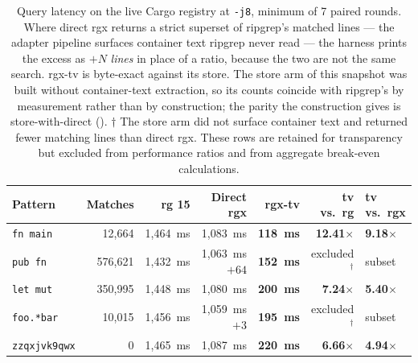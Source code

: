 \documentclass[11pt,letterpaper]{article}
\begin{document}
\begin{table}[htbp]
\centering
\footnotesize
\caption{Query latency on the live Cargo registry at \texttt{-j8},
minimum of 7 paired rounds. Where direct rgx returns a strict superset of
ripgrep's matched lines --- the adapter pipeline surfaces container text
ripgrep never read --- the harness prints the excess as $+N$ \emph{lines} in
place of a ratio, because the two are not the same search. rgx-tv is
byte-exact against its store. The store arm of this snapshot was built without
container-text extraction, so its counts coincide with ripgrep's by
measurement rather than by construction; the parity the construction gives is
store-with-direct (). $\dagger$ The store arm did not surface
container text and returned fewer matching lines than direct rgx. These rows are
retained for transparency but excluded from performance ratios and from
aggregate break-even calculations.}
\label{tab:cargo}
\begin{tabular}{@{}lrrrrrl@{}}
\toprule
\textbf{Pattern} & \textbf{Matches} & \textbf{rg 15} & \textbf{Direct rgx}
  & \textbf{rgx-tv} & \textbf{tv vs.\ rg} & \textbf{tv vs.\ rgx} \\
\midrule
\texttt{fn main}     &  12{,}664 & 1{,}464~ms & 1{,}083~ms & \textbf{118~ms} & \textbf{12.41$\times$} & \textbf{9.18$\times$} \\
\texttt{pub fn}      & 576{,}621 & 1{,}432~ms & 1{,}063~ms $+64$ & \textbf{152~ms} & excluded$^\dagger$ & subset \\
\texttt{let mut}     & 350{,}995 & 1{,}448~ms & 1{,}080~ms & \textbf{200~ms} & \textbf{7.24$\times$} & \textbf{5.40$\times$} \\
\texttt{foo.*bar}    &  10{,}015 & 1{,}456~ms & 1{,}059~ms $+3$ & \textbf{195~ms} & excluded$^\dagger$ & subset \\
\texttt{zzqxjvk9qwx} &        0 & 1{,}465~ms & 1{,}087~ms & \textbf{220~ms} & \textbf{6.66$\times$} & \textbf{4.94$\times$} \\
\bottomrule
\end{tabular}
\end{table}
\end{document}
